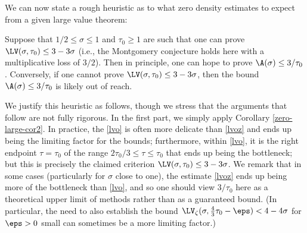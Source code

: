We can now state a rough heuristic as to what zero density estimates to expect from a given large value theorem:

\begin{heuristic}\label{lv-heuristic} Suppose that $1/2 \leq \sigma \leq 1$ and $\tau_0 \geq 1$ are such that one can prove $\LV(\sigma, \tau_0) \leq 3-3\sigma$ (i.e., the Montgomery conjecture holds here with a multiplicative loss of $3/2$).  Then in principle, one can hope to prove $\A(\sigma) \leq 3/\tau_0$.  Conversely, if one cannot prove $\LV(\sigma, \tau_0) \leq 3-3\sigma$, then the bound $\A(\sigma) \leq 3/\tau_0$ is likely out of reach.
\end{heuristic}

We justify this heuristic as follows, though we stress that the arguments that follow are not fully rigorous.  In the first part, we simply apply Corollary \ref{zero-large-cor2}.  In practice, the \eqref{lvo} is often more delicate than \eqref{lvoz} and ends up being the limiting factor for the bounds; furthermore, within \eqref{lvo}, it is the right endpoint $\tau=\tau_0$ of the range $2\tau_0/3 \leq \tau \leq \tau_0$ that ends up being the bottleneck; but this is precisely the claimed criterion $\LV(\sigma, \tau_0) \leq 3-3\sigma$.  We remark that in some cases (particularly for $\sigma$ close to one), the estimate \eqref{lvoz} ends up being more of the bottleneck than \eqref{lvo}, and so one should view $3/\tau_0$ here as a theoretical upper limit of methods rather than as a guaranteed bound.  (In particular, the need to also establish the bound $\LV_\zeta(\sigma, \frac{4}{3}\tau_0-\eps) < 4-4\sigma$ for $\eps>0$ small can sometimes be a more limiting factor.)

